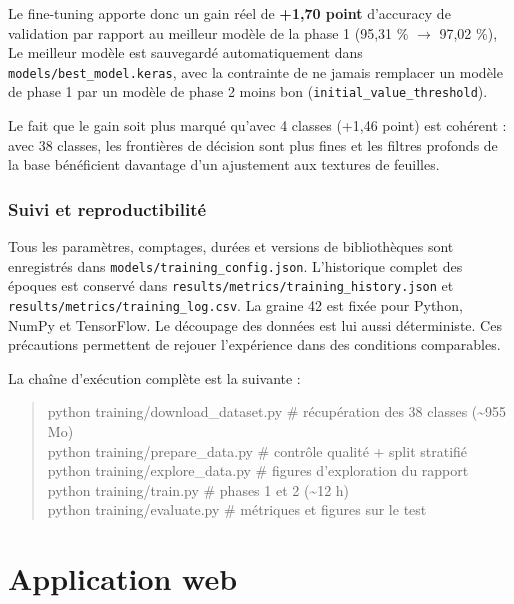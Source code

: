 \documentclass[10pt,a4paper]{article}
\begin{document}
Le fine-tuning apporte donc un gain réel de \textbf{+1,70 point} d'accuracy de validation par rapport au meilleur modèle de la phase 1 (95,31 \% $\rightarrow$ 97,02 \%), Le meilleur modèle est sauvegardé automatiquement dans \texttt{models/\allowbreak{}best\_\allowbreak{}model.keras}, avec la contrainte de ne jamais remplacer un modèle de phase 1 par un modèle de phase 2 moins bon (\texttt{initial\_\allowbreak{}value\_\allowbreak{}threshold}).

Le fait que le gain soit plus marqué qu'avec 4 classes (+1,46 point) est cohérent : avec 38 classes, les frontières de décision sont plus fines et les filtres profonds de la base bénéficient davantage d'un ajustement aux textures de feuilles.

\subsubsection{Suivi et reproductibilité}

Tous les paramètres, comptages, durées et versions de bibliothèques sont enregistrés dans \texttt{models/\allowbreak{}training\_\allowbreak{}config.json}. L'historique complet des époques est conservé dans \texttt{results/\allowbreak{}metrics/\allowbreak{}training\_\allowbreak{}history.json} et \texttt{results/\allowbreak{}metrics/\allowbreak{}training\_\allowbreak{}log.csv}. La graine 42 est fixée pour Python, NumPy et TensorFlow. Le découpage des données est lui aussi déterministe. Ces précautions permettent de rejouer l'expérience dans des conditions comparables.

La chaîne d'exécution complète est la suivante :

\begin{quote}\ttfamily\small
python training/download\_dataset.py   \# récupération des 38 classes (\textasciitilde{}955 Mo)\\
python training/prepare\_data.py       \# contrôle qualité + split stratifié\\
python training/explore\_data.py       \# figures d'exploration du rapport\\
python training/train.py              \# phases 1 et 2 (\textasciitilde{}12 h)\\
python training/evaluate.py           \# métriques et figures sur le test\\
\end{quote}

\clearpage

\section{Application web}
\label{sec:5}%
\end{document}

